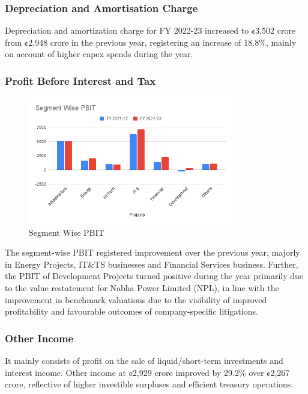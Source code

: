 \subsubsection{Depreciation and Amortisation Charge}

Depreciation and amortization charge for FY 2022-23 increased to ¢3,502 crore from ¢2,948 crore in the previous year, registering an increase of 18.8\%, mainly on account of higher capex spends during the year.

\subsubsection{Profit Before Interest and Tax
}
\begin{figure}
    \centering
    \includegraphics[width=0.8\textwidth]{Segment Wise PBIT.png}
    \caption{Segment Wise PBIT}
  \end{figure}
  

The segment-wise PBIT registered improvement over the
previous year, majorly in Energy Projects, IT\&TS businesses
and Financial Services business. Further, the PBIT of
Development Projects turned positive during the year
primarily due to the value restatement for Nabha Power
Limited (NPL), in line with the improvement in benchmark
valuations due to the visibility of improved profitability and
favourable outcomes of company-specific litigations.

\subsubsection{Other Income}

It mainly consists of profit on the sale of liquid/short-term investments and interest income. Other income at ¢2,929 crore improved by 29.2\% over ¢2,267 crore, reflective of higher investible surpluses and efficient treasury operations.

